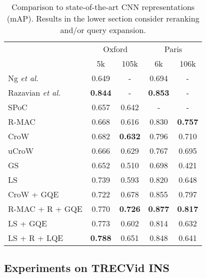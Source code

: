 \documentclass{sig-arxiv}
\begin{document}
\begin{table}[t]
\centering
\caption{Comparison to state-of-the-art CNN representations (mAP). Results in the lower section consider reranking and/or query expansion.}
\label{tab_soa}
\begin{tabular}{lcccc}
\hline
                      & \multicolumn{2}{c}{Oxford} & \multicolumn{2}{c}{Paris} \\ 
                      & 5k           & 105k        & 6k          & 106k        \\ \hline
Ng \emph{et al.} \cite{ng2015}                    & 0.649        & -           & 0.694       & -           \\ 
Razavian \emph{et al.} \cite{razavian2015}              &\textbf{0.844}& -           & \textbf{0.853}       & -           \\ 
SPoC \cite{babenko2015}                & 0.657        & 0.642       & -           & -           \\ 
R-MAC \cite{tolias2015}                & 0.668        & 0.616       & 0.830       & \textbf{0.757}       \\ 
CroW \cite{kalantidis2015}                 & 0.682        & \textbf{0.632}       & 0.796       & 0.710       \\ 
uCroW \cite{kalantidis2015}                 & 0.666        & 0.629       & 0.767      & 0.695       \\ 
GS            & 0.652        & 0.510      & 0.698       & 0.421       \\ 
LS            & 0.739        & 0.593      & 0.820       & 0.648       \\ 
\hline
CroW + GQE \cite{kalantidis2015}            & 0.722        & 0.678       & 0.855       & 0.797       \\ 

R-MAC + R + GQE \cite{tolias2015}      & 0.770        & \textbf{0.726}       & \textbf{0.877}       & \textbf{0.817}       \\ 
LS + GQE      &0.773& 0.602           & 0.814       & 0.632           \\ 
LS + R + LQE & \textbf{0.788} & 0.651           & 0.848       & 0.641           \\ 
\hline
\end{tabular}
\vspace{-10.5pt}
\end{table}\subsection{Experiments on TRECVid INS}
\end{document}
